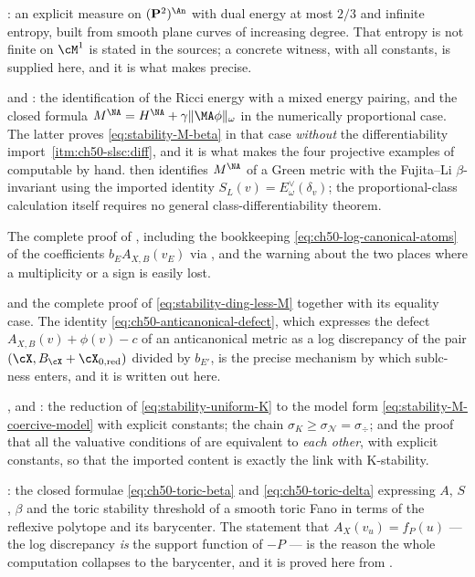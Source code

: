: an explicit measure on
$(\mathbf P^2)^{\An}$ with dual energy at most $2/3$ and infinite
entropy, built from smooth plane curves of increasing degree.  That entropy
is not finite on $\cM^1$ is stated in the sources; a concrete witness,
with all constants, is supplied here, and it is what makes
 precise.

 and : the
identification of the Ricci energy with a mixed energy pairing, and the
closed formula $M^{\NA}=H^{\NA}+\gamma\|\MA\phi\|_\omega$ in the
numerically proportional case.  The latter proves
\eqref{eq:stability-M-beta} in that case \emph{without} the
differentiability import
\,\cref{itm:ch50-slsc:diff}, and it is what makes
the four projective examples of 
computable by hand.
 then identifies $M^{\NA}$ of a Green metric with
the Fujita--Li $\beta$-invariant using the imported identity
$S_L(v)=E^\vee_\omega(\delta_v)$; the proportional-class calculation
itself requires no general class-differentiability theorem.

The complete proof of , including the
bookkeeping \eqref{eq:ch50-log-canonical-atoms} of the coefficients
$b_EA_{X,B}(v_E)$ via , and the
warning  about the two places where a
multiplicity or a sign is easily lost.

 and the complete proof of
\eqref{eq:stability-ding-less-M} together with its equality case.  The
identity \eqref{eq:ch50-anticanonical-defect}, which expresses the defect
$A_{X,B}(v)+\phi(v)-c$ of an anticanonical metric as a log discrepancy of
the pair $(\cX,B_\cX+\cX_{0,\mathrm{red}})$ divided by $b_{E'}$, is the
precise mechanism by which sublc-ness enters, and it is written out here.

,
 and
: the reduction of
\eqref{eq:stability-uniform-K} to the model form
\eqref{eq:stability-M-coercive-model} with explicit constants; the chain
$\sigma_K\ge\sigma_{\mathcal N}=\sigma_{\div}$; and the proof that all
the valuative conditions of  are
equivalent to \emph{each other}, with explicit constants, so that the
imported content is exactly the link with K-stability.

: the closed formulae
\eqref{eq:ch50-toric-beta} and \eqref{eq:ch50-toric-delta} expressing
$A$, $S$, $\beta$ and the toric stability threshold of a smooth toric
Fano in terms of the reflexive polytope and its barycenter.  The
statement that $A_X(v_u)=f_P(u)$ --- the log discrepancy \emph{is} the
support function of $-P$ --- is the reason the whole computation
collapses to the barycenter, and it is proved here from
.

